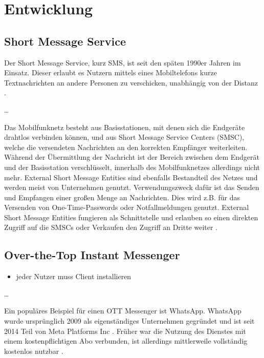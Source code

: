 \documentclass[conference]{IEEEtran}
\begin{document}
\section{Entwicklung}

\subsection{Short Message Service}

Der Short Message Service, kurz SMS, ist seit den späten 1990er Jahren im Einsatz. Dieser erlaubt es Nutzern mittels eines Mobiltelefons kurze Textnachrichten an andere Personen zu verschicken, unabhängig von der Distanz \cite{sendoutsms}.

\dots

Das Mobilfunknetz besteht aus Basisstationen, mit denen sich die Endgeräte drahtlos verbinden können, und aus Short Message Service Centers (SMSC), welche die versendeten Nachrichten an den korrekten Empfänger weiterleiten. Während der Übermittlung der Nachricht ist der Bereich zwischen dem Endgerät und der Basisstation verschlüsselt, innerhalb des Mobilfunknetzes allerdings nicht mehr. External Short Message Entities sind ebenfalls Bestandteil des Netzes und werden meist von Unternehmen genutzt. Verwendungszweck dafür ist das Senden und Empfangen einer großen Menge an Nachrichten. Dies wird z.B. für das Versenden von One-Time-Passwords oder Notfallmeldungen genutzt. External Short Message Entities fungieren als Schnittstelle und erlauben so einen direkten Zugriff auf die SMSCs oder Verkaufen den Zugriff an Dritte weiter \cite{sendoutsms}.

\subsection{Over-the-Top Instant Messenger}

\begin{itemize}
    \item jeder Nutzer muss Client installieren
\end{itemize}
\cite{rcsmno}

\dots

Ein populäres Beispiel für einen OTT Messenger ist WhatsApp.
WhatsApp wurde ursprünglich 2009 als eigenständiges Unternehmen gegründet und ist seit 2014 Teil von Meta Platforms Inc \cite{watimeline}.
Früher war die Nutzung des Dienstes mit einem kostenpflichtigen Abo verbunden, ist allerdings mittlerweile vollständig kostenlos nutzbar \cite{wakostenlos}.
\end{document}
